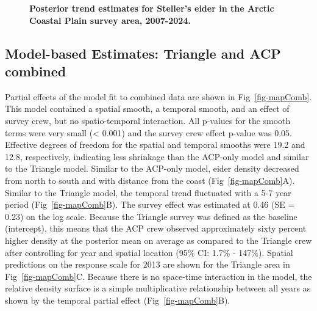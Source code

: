 \documentclass[
  10pt,
  letterpaper,
]{article}
\begin{document}
\begin{figure}

\caption{\label{fig-trendACP}\textbf{Posterior trend estimates for Steller's eider in the Arctic Coastal Plain survey area, 2007-2024.} }

\end{figure}%

\subsection{Model-based Estimates: Triangle and ACP
combined}\label{model-based-estimates-triangle-and-acp-combined}

Partial effects of the model fit to combined data are shown in
Fig~\ref{fig-mapComb}. This model contained a spatial smooth, a temporal
smooth, and an effect of survey crew, but no spatio-temporal
interaction. All p-values for the smooth terms were very small
(< 0.001) and the survey crew effect p-value was
0.05. Effective degrees of freedom for the spatial and temporal smooths
were 19.2 and 12.8, respectively, indicating less shrinkage than the
ACP-only model and similar to the Triangle model. Similar to the
ACP-only model, eider density decreased from north to south and with
distance from the coast (Fig~\ref{fig-mapComb}A). Similar to the
Triangle model, the temporal trend fluctuated with a 5-7 year period
(Fig~\ref{fig-mapComb}B). The survey effect was estimated at 0.46 (SE =
0.23) on the log scale. Because the Triangle survey was defined as the
baseline (intercept), this means that the ACP crew observed
approximately sixty percent higher density at the posterior mean on
average as compared to the Triangle crew after controlling for year and
spatial location (95\% CI: 1.7\% - 147\%). Spatial predictions on the
response scale for 2013 are shown for the Triangle area in
Fig~\ref{fig-mapComb}C. Because there is no space-time interaction in
the model, the relative density surface is a simple multiplicative
relationship between all years as shown by the temporal partial effect
(Fig~\ref{fig-mapComb}B).
\end{document}
